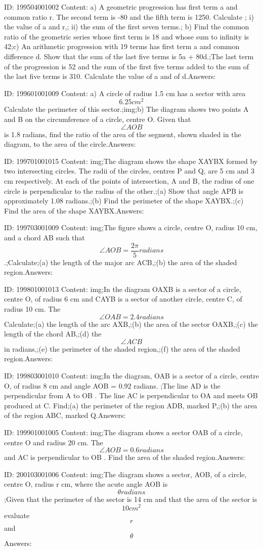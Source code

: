 \documentclass{article}
\begin{document}
ID: 199504001002
Content:
a) A geometric progression has first term a and common ratio r. The second term is -80 and the fifth term is 1250. Calculate ; i) the value of a and r,; ii) the sum of the first seven terms.; b) Find the common ratio of the geometric series whose first term is 18 and whose sum to infinity is 42;c) An arithmetic progression with 19 terms has first term a and common difference d. Show that the sum of the last five terms is 5a + 80d.;The last term of the progression is 52 and the sum of the first five terms added to the sum of the last five terms is 310. Calculate the value of a and of d.Answers:

ID: 199601001009
Content:
a) A circle of radius 1.5 cm has a sector with area \[6.25 cm^2\] Calculate the perimeter of this sector.;img;b) The diagram shows two points A and B on the circumference of a circle, centre O. Given that \[\angle AOB\] is 1.8 radians, find the ratio of the area of the segment, shown shaded in the diagram, to the area of the circle.Answers:

ID: 199701001015
Content:
img;The diagram shows the shape XAYBX formed by two intersecting circles. The radii of the circles, centres P and Q, are 5 cm and 3 cm respectively. At each of the points of intersection, A and B, the radius of one circle is perpendicular to the radius of the other.;(a)	Show that angle APB is approximately 1.08 radians.;(b)	Find the perimeter of the shape XAYBX.;(c)	Find the area of the shape XAYBX.Answers:

ID: 199703001009
Content:
img;The figure shows a circle, centre O, radius 10 cm, and a chord AB such that \[\angle AOB = \frac{2\pi }{5}radians\].;Calculate;(a)	the length of the major arc ACB,;(b)	the area of the shaded region.Answers:

ID: 199801001013
Content:
img;In the diagram OAXB is a sector of a circle, centre O, of radius 6 cm and CAYB is a sector of another circle, centre C, of radius 10 cm. The \[\angle OAB = 2.4 radians\] Calculate;(a)	the length of the arc AXB,;(b)	the area of the sector OAXB,;(c)	the length of the chord AB,;(d)	the \[\angle ACB\] in radians,;(e)	the perimeter of the shaded region,;(f)	the area of the shaded region.Answers:

ID: 199803001010
Content:
img;In the diagram, OAB is a sector of a circle, centre O, of radius 8 cm and angle AOB = 0.92 radians. ;The line AD is the perpendicular from A to OB . The line AC is perpendicular to OA and meets OB produced at C. Find;(a)	the perimeter of the region ADB, marked P,;(b)	the area of the region ABC, marked Q.Answers:

ID: 199901001005
Content:
img;The diagram shows a sector OAB of a circle, centre O and radius 20 cm. The \[\angle AOB = 0.6 radians\]and AC is perpendicular to OB . Find the area of the shaded region.Answers:

ID: 200103001006
Content:
img;The diagram shows a sector, AOB, of a circle, centre O, radius r cm, where the acute angle AOB is \[\theta radians\] ;Given that the perimeter of the sector is 14 cm and that the area of the sector is \[10 cm^2\] evaluate \[r\] and \[\theta\]Answers:
\end{document}
